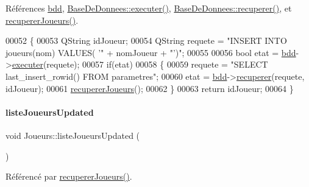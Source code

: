 Références \hyperlink{class_joueurs_ac060c3017311b67a97ed488ce2bb2332}{bdd}, \hyperlink{class_base_de_donnees_aa8de5f8f8bb17edc43f5c0ee33712081}{Base\+De\+Donnees\+::executer()}, \hyperlink{class_base_de_donnees_a77539baad389f5acf754cd2cd452403e}{Base\+De\+Donnees\+::recuperer()}, et \hyperlink{class_joueurs_a5bd70438c6624d8dca765e322285eb61}{recuperer\+Joueurs()}.


\begin{DoxyCode}
00052 \{
00053     QString idJoueur;
00054     QString requete = \textcolor{stringliteral}{"INSERT INTO joueurs(nom) VALUES( '"} + nomJoueur + \textcolor{stringliteral}{"')"};
00055 
00056     \textcolor{keywordtype}{bool} etat = \hyperlink{class_joueurs_ac060c3017311b67a97ed488ce2bb2332}{bdd}->\hyperlink{class_base_de_donnees_aa8de5f8f8bb17edc43f5c0ee33712081}{executer}(requete);
00057     \textcolor{keywordflow}{if}(etat)
00058     \{
00059         requete = \textcolor{stringliteral}{"SELECT last\_insert\_rowid() FROM parametres"};
00060         etat = \hyperlink{class_joueurs_ac060c3017311b67a97ed488ce2bb2332}{bdd}->\hyperlink{class_base_de_donnees_a77539baad389f5acf754cd2cd452403e}{recuperer}(requete, idJoueur);
00061         \hyperlink{class_joueurs_a5bd70438c6624d8dca765e322285eb61}{recupererJoueurs}();
00062     \}
00063     \textcolor{keywordflow}{return} idJoueur;
00064 \}
\end{DoxyCode}
\mbox{\label{class_joueurs_a5df3ead7bec2c66c600ec53880afe035}} 
\paragraph{\texorpdfstring{liste\+Joueurs\+Updated}{listeJoueursUpdated}}
{\footnotesize\ttfamily void Joueurs\+::liste\+Joueurs\+Updated (\begin{DoxyParamCaption}{ }\end{DoxyParamCaption})\hspace{0.3cm}{\ttfamily [signal]}}



Référencé par \hyperlink{class_joueurs_a5bd70438c6624d8dca765e322285eb61}{recuperer\+Joueurs()}.

\mbox{\label{class_joueurs_a5bd70438c6624d8dca765e322285eb61}} 

